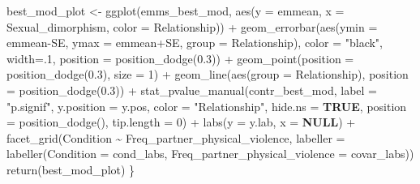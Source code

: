 \documentclass[
  bookmarksnumbered]{article}
\newenvironment{Shaded}{\begin{snugshade}}{\end{snugshade}}
\newcommand{\AttributeTok}[1]{\textcolor[rgb]{0.80,0.80,0.80}{#1}}
\newcommand{\ConstantTok}[1]{\textcolor[rgb]{0.86,0.64,0.64}{\textbf{#1}}}
\newcommand{\DecValTok}[1]{\textcolor[rgb]{0.86,0.86,0.80}{#1}}
\newcommand{\FloatTok}[1]{\textcolor[rgb]{0.75,0.75,0.82}{#1}}
\newcommand{\FunctionTok}[1]{\textcolor[rgb]{0.94,0.94,0.56}{#1}}
\newcommand{\NormalTok}[1]{\textcolor[rgb]{0.80,0.80,0.80}{#1}}
\newcommand{\OtherTok}[1]{\textcolor[rgb]{0.94,0.94,0.56}{#1}}
\newcommand{\SpecialCharTok}[1]{\textcolor[rgb]{0.86,0.64,0.64}{#1}}
\newcommand{\StringTok}[1]{\textcolor[rgb]{0.80,0.58,0.58}{#1}}
\begin{document}
\begin{Shaded}
\begin{Highlighting}[]
\NormalTok{  best\_mod\_plot }\OtherTok{\textless{}{-}} \FunctionTok{ggplot}\NormalTok{(emms\_best\_mod, }
                          \FunctionTok{aes}\NormalTok{(}\AttributeTok{y =}\NormalTok{ emmean, }\AttributeTok{x =}\NormalTok{ Sexual\_dimorphism, }\AttributeTok{color =}\NormalTok{ Relationship)) }\SpecialCharTok{+}
    \FunctionTok{geom\_errorbar}\NormalTok{(}\FunctionTok{aes}\NormalTok{(}\AttributeTok{ymin =}\NormalTok{ emmean}\SpecialCharTok{{-}}\NormalTok{SE,}
                      \AttributeTok{ymax =}\NormalTok{ emmean}\SpecialCharTok{+}\NormalTok{SE,}
                      \AttributeTok{group =}\NormalTok{ Relationship), }
                  \AttributeTok{color =} \StringTok{"black"}\NormalTok{,}
                  \AttributeTok{width=}\NormalTok{.}\DecValTok{1}\NormalTok{,}
                  \AttributeTok{position =} \FunctionTok{position\_dodge}\NormalTok{(}\FloatTok{0.3}\NormalTok{)) }\SpecialCharTok{+}
    \FunctionTok{geom\_point}\NormalTok{(}\AttributeTok{position =} \FunctionTok{position\_dodge}\NormalTok{(}\FloatTok{0.3}\NormalTok{), }\AttributeTok{size =} \DecValTok{1}\NormalTok{) }\SpecialCharTok{+}
    \FunctionTok{geom\_line}\NormalTok{(}\FunctionTok{aes}\NormalTok{(}\AttributeTok{group =}\NormalTok{ Relationship),}
              \AttributeTok{position =} \FunctionTok{position\_dodge}\NormalTok{(}\FloatTok{0.3}\NormalTok{)) }\SpecialCharTok{+} 
    \FunctionTok{stat\_pvalue\_manual}\NormalTok{(contr\_best\_mod, }\AttributeTok{label =} \StringTok{"p.signif"}\NormalTok{, }
                       \AttributeTok{y.position =}\NormalTok{ y.pos,}
                       \AttributeTok{color =} \StringTok{"Relationship"}\NormalTok{, }\AttributeTok{hide.ns =} \ConstantTok{TRUE}\NormalTok{,}
                       \AttributeTok{position =} \FunctionTok{position\_dodge}\NormalTok{(),}
                       \AttributeTok{tip.length =} \DecValTok{0}\NormalTok{) }\SpecialCharTok{+}
    \FunctionTok{labs}\NormalTok{(}\AttributeTok{y =}\NormalTok{ y.lab,}
         \AttributeTok{x =} \ConstantTok{NULL}\NormalTok{) }\SpecialCharTok{+}
    \FunctionTok{facet\_grid}\NormalTok{(Condition }\SpecialCharTok{\textasciitilde{}}\NormalTok{ Freq\_partner\_physical\_violence,}
               \AttributeTok{labeller =} \FunctionTok{labeller}\NormalTok{(}\AttributeTok{Condition =}\NormalTok{ cond\_labs,}
                                   \AttributeTok{Freq\_partner\_physical\_violence =}\NormalTok{ covar\_labs))}
  \FunctionTok{return}\NormalTok{(best\_mod\_plot)}
\NormalTok{\}}
\end{Highlighting}
\end{Shaded}
\end{document}
